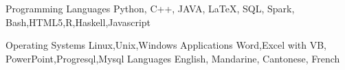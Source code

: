 \documentclass[11pt, a4paper]{awesome-cv} %
\begin{document}
\begin{cvskills}
	
	
	\cvskill
	{Programming Languages} %
	{Python, C++,  JAVA, LaTeX, SQL, Spark, Bash,HTML5,R,Haskell,Javascript} %
	
	\cvskill
	{Operating Systems}
	{Linux,Unix,Windows}
	\cvskill
	{Applications}
	{Word,Excel with VB, PowerPoint,Progresql,Mysql}
	\cvskill
	{Languages} %
	{English, Mandarine, Cantonese, French} %
	
	
\end{cvskills}



\end{document}
